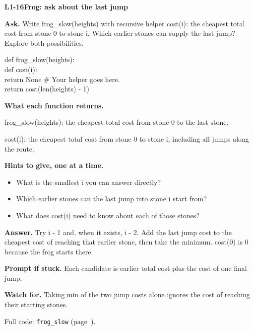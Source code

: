 \documentclass[11pt,a4paper]{article}
\begin{document}
\noindent\begin{minipage}{\textwidth}
{\color{teal}\textbf{L1-16}}\quad \textbf{Frog: ask about the last jump}\par\smallskip
\textbf{Ask.} Write frog\_slow(heights) with recursive helper cost(i): the cheapest total cost from stone 0 to stone i. Which earlier stones can supply the last jump? Explore both possibilities.\par\smallskip
\par{}\par\smallskip\noindent\colorbox{codepaper}{\parbox{\dimexpr\linewidth-2\fboxsep\relax}{\small\ttfamily\raggedright def frog\_slow(heights):\\\hspace*{2.4em}def cost(i):\\\hspace*{4.8em}return None  \# Your helper goes here.\\\hspace*{2.4em}return cost(len(heights) - 1)}}\par
{\small\textbf{What each function returns.}\par frog\_slow(heights): the cheapest total cost from stone 0 to the last stone.\par cost(i): the cheapest total cost from stone 0 to stone i, including all jumps along the route.\par }
{\small\textbf{Hints to give, one at a time.}}\begin{itemize}\item What is the smallest i you can answer directly?\item Which earlier stones can the last jump into stone i start from?\item What does cost(i) need to know about each of those stones?\end{itemize}
\textbf{Answer.} Try i - 1 and, when it exists, i - 2. Add the last jump cost to the cheapest cost of reaching that earlier stone, then take the minimum. cost(0) is 0 because the frog starts there.\par\smallskip
\textbf{Prompt if stuck.} Each candidate is earlier total cost plus the cost of one final jump.\par\smallskip
\textbf{Watch for.} Taking min of the two jump costs alone ignores the cost of reaching their starting stones.\par\smallskip Full code: \texttt{frog\_slow} (page~\pageref{L1-code-frog_slow}).
\end{minipage}\par{}\medskip
\end{document}
